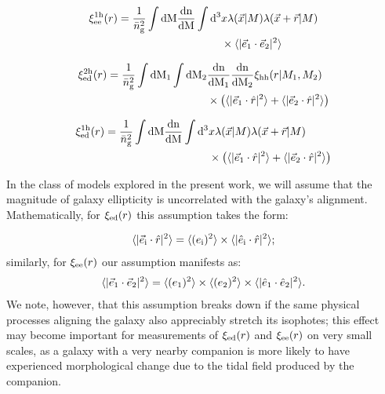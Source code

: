\documentclass[fleqn,usenatbib]{mnras}
\newcommand{\tpcf}[1]{\xi_{\rm #1}}
\newcommand{\tpcftwo}[2]{\xi_{\rm #1}^{\rm #2}}
\newcommand{\evec}[1]{\vec{e}_{\rm #1}}
\newcommand{\evechat}[1]{\hat{e}_{\rm #1}}
\newcommand{\dd}{\rm d}
\newcommand{\mean}[1]{\langle #1 \rangle}
\begin{document}
\begin{align}
\begin{split}
\tpcftwo{ee}{1h}(r) =  \frac{1}{\bar{n}_{\rm g}^{2}} \int\dd M \frac{\rm dn}{\dd M} \int\dd^{3}& x\lambda(\vec{x}\vert M)\lambda(\vec{x}+\vec{r}\vert M)\\ & \times  \mean{\vert\evec{1}\cdot\evec{2}\vert^{2}}
\end{split}
\end{align}

\begin{align}
\begin{split}
\tpcftwo{ed}{2h}(r) =   \frac{1}{\bar{n}_{\rm g}^{2}}\int\dd M_1 \int\dd M_2 & \frac{\rm dn}{\dd M_1}\frac{\rm dn}{\dd M_2} \tpcf{hh}(r\vert M_1, M_2) \\& \times \left( \mean{\vert\evec{1}\cdot\hat{r}\vert^{2}} +  \mean{\vert\evec{2}\cdot\hat{r}\vert^{2}} \right)
\end{split}
\end{align}

\begin{align}
\begin{split}
\tpcftwo{ed}{1h}(r) =  \frac{1}{\bar{n}_{\rm g}^{2}} \int\dd M \frac{\rm dn}{\dd M} \int\dd^{3}& x\lambda(\vec{x}\vert M)\lambda(\vec{x}+\vec{r}\vert M)\\ & \times \left(  \mean{\vert\evec{1}\cdot\hat{r}\vert^{2}} + \mean{\vert\evec{2}\cdot\hat{r}\vert^{2}} \right)
\end{split}
\end{align}

In the class of models explored in the present work, we will assume that the magnitude of galaxy ellipticity is uncorrelated with the galaxy's alignment. Mathematically, for $\tpcf{ed}(r)$ this assumption takes the form:

\begin{align}
\label{eq:uncorrelated_ellipticity_ed}
 \mean{\vert\evec{i}\cdot\hat{r}\vert^{2}} =  \mean{(e_{\rm i})^{2}}\times\mean{\vert\evechat{i}\cdot\hat{r}\vert^{2}};
\end{align}
similarly, for $\tpcf{ee}(r)$ our assumption manifests as:  
\begin{align}
\label{eq:uncorrelated_ellipticity_ee}
\mean{\vert\evec{1}\cdot\evec{2}\vert^{2}} =  \mean{(e_{1})^{2}}\times\mean{(e_{2})^{2}}\times\mean{\vert\evechat{1}\cdot\evechat{2}\vert^{2}}.
\end{align}
We note, however, that this assumption breaks down if the same physical processes aligning the galaxy also appreciably stretch its isophotes; this effect may become important for measurements of $\tpcf{ed}(r)$ and $\tpcf{ee}(r)$ on very small scales, as a galaxy with a very nearby companion is more likely to have experienced morphological change due to the tidal field produced by the companion. 
\end{document}
